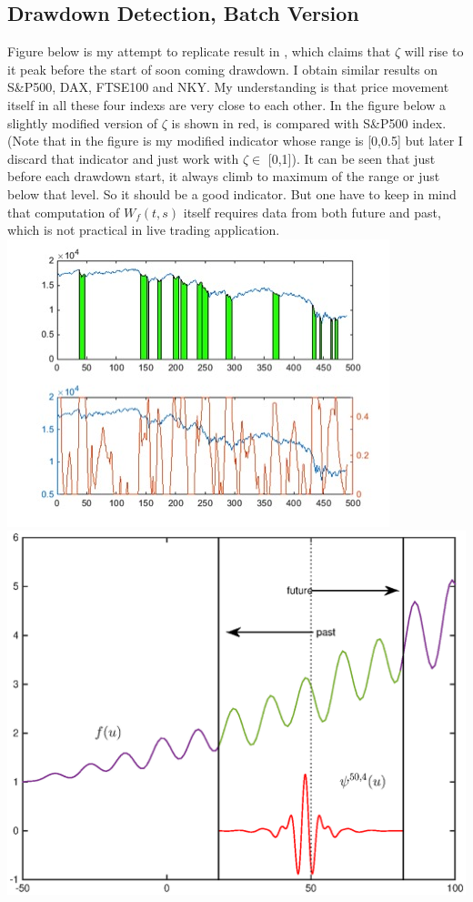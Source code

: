 \documentclass[a4paper]{article}
\begin{document}
\subsection{Drawdown Detection, Batch Version}
Figure below is my attempt to replicate result in \cite{caete09}, which claims that $\zeta$ will rise to it peak before the start of soon coming drawdown. I obtain similar results on S\&P500, DAX, FTSE100 and NKY. My understanding is that price movement itself in all these four indexs are very close to each other. In the figure below a slightly modified version of $\zeta$ is shown in red, is compared with S\&P500 index.(Note that in the figure is my modified indicator whose range is [0,0.5] but later I discard that indicator and just work with $\zeta \in$ [0,1]). It can be seen that just before each drawdown start, it always climb to maximum of the range or just below that level. So it should be a good indicator. But one have to keep in mind that computation of $W_f(t,s)$ itself requires data from both future and past, which is not practical in live trading application.
\includegraphics[width=\textwidth]{drawdown.jpg}
\includegraphics[width=\textwidth]{pastvsfuture1.eps}
\end{document}
